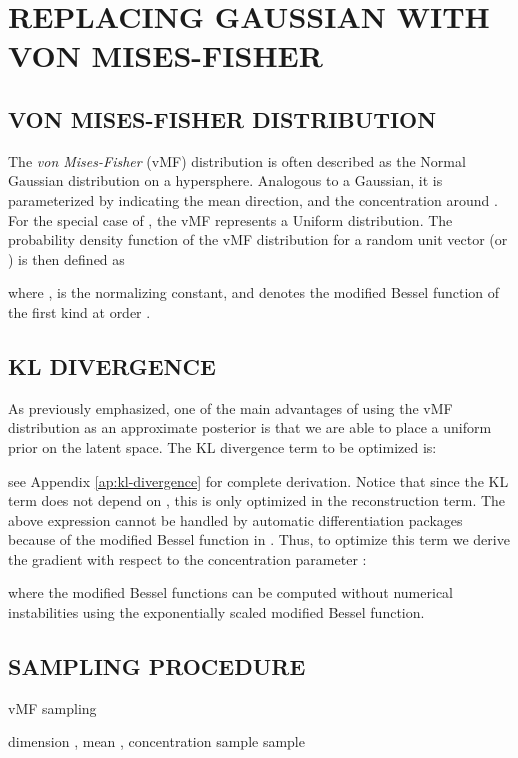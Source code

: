 \documentclass[letterpaper]{article}
\begin{document}
\section{REPLACING GAUSSIAN WITH VON MISES-FISHER}
\subsection{VON MISES-FISHER DISTRIBUTION}\label{subsec:vMF}

The \textit{von Mises-Fisher} (vMF) distribution is often described as the Normal Gaussian distribution on a hypersphere. Analogous to a Gaussian, it is parameterized by  indicating the mean direction, and  the concentration around . For the special case of , the vMF represents a Uniform distribution. The probability density function of the vMF distribution for a random unit vector  (or ) is then defined as

where ,  is the normalizing constant, and  denotes the modified Bessel function of the first kind at order .

\subsection{KL DIVERGENCE} \label{subsec:kl}
As previously emphasized, one of the main advantages of using the vMF distribution as an approximate posterior is that we are able to place a uniform prior on the latent space. The KL divergence term  to be optimized is: 

see Appendix \ref{ap:kl-divergence} for complete derivation. Notice that since the KL term does not depend on , this is only optimized in the reconstruction term. The above expression cannot be handled by automatic differentiation packages because of the modified Bessel function in . Thus, to optimize this term we derive the gradient with respect to the concentration parameter :

where the modified Bessel functions can be computed without numerical instabilities using the exponentially scaled modified Bessel function.

\subsection{SAMPLING PROCEDURE}\label{sec:sampling}

\begin{algorithm}[tb]\label{sampling-vmf}
   \caption{vMF sampling}
   \label{alg:vmf-sample}
\begin{algorithmic}
     dimension , mean , concentration 
    \STATE sample 
    \STATE sample  
    \STATE 
    \STATE  {}
\end{algorithmic}
\end{algorithm}
\end{document}
